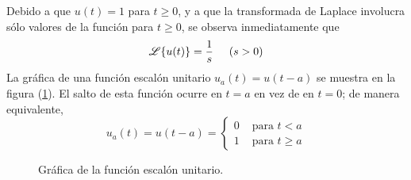 Debido a que $u(t) = 1$ para $t \geq 0$, y a que la transformada de Laplace involucra sólo valores de la función para $t \geq 0$, se observa inmediatamente que
\begin{equation}
\mathscr{L} \{ u(t) \} = \dfrac{1}{s} \hspace{0.5cm} (s > 0)
\label{eq:020}
\end{equation}
La gráfica de una función escalón unitario $u_{a}(t) = u(t - a)$ se muestra en la figura (\ref{fig:figura_07_01_05}). El salto de esta función ocurre en $t = a$ en vez de en $t = 0$; de manera equivalente,
\begin{equation}
u_{a}(t) = u (t - a) = \begin{cases}
0 & \mbox{ para } t < a \\
1 & \mbox{ para } t \geq a
\end{cases}
\end{equation}
\begin{figure}[!ht]
    \centering
    
    \caption{Gráfica de la función escalón unitario.}
    \label{fig:figura_07_01_05}
\end{figure}
